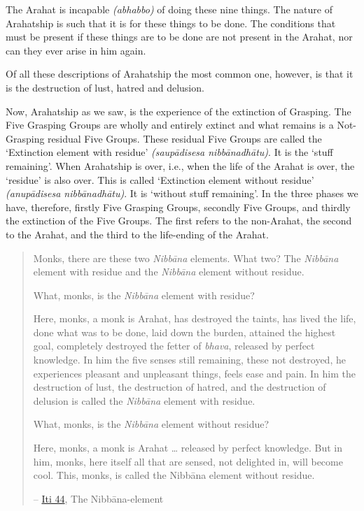 The Arahat is incapable \emph{(abhabbo)} of doing these nine things. The nature of Arahatship is such that it is  for these things to be done. The conditions that must be present if these things are to be done are not present in the Arahat, nor can they ever arise in him again.

Of all these descriptions of Arahatship the most common one, however, is that it is the destruction of lust, hatred and delusion.

\label{ch-13-remainder}Now, Arahatship as we saw, is the experience of the extinction of Grasping. The Five Grasping Groups are wholly and entirely extinct and what remains is a Not-Grasping residual Five Groups. These residual Five Groups are called the `Extinction element with residue' \emph{(saupādisesa nibbānadhātu)}. It is the `stuff remaining'. When Arahatship is over, i.e., when the life of the Arahat is over, the `residue' is also over. This is called `Extinction element without residue' \emph{(anupādisesa nibbānadhātu)}. It is `without stuff remaining'. In the three phases we have, therefore, firstly Five Grasping Groups, secondly Five Groups, and thirdly the extinction of the Five Groups. The first refers to the non-Arahat, the second to the Arahat, and the third to the life-ending of the Arahat.

\begin{quote}
Monks, there are these two \emph{Nibbāna} elements. What two? The \emph{Nibbāna} element with residue and the \emph{Nibbāna} element without residue.

What, monks, is the \emph{Nibbāna} element with residue?

Here, monks, a monk is Arahat, has destroyed the taints, has lived the life, done what was to be done, laid down the burden, attained the highest goal, completely destroyed the fetter of \emph{bhava}, released by perfect knowledge. In him the five senses still remaining, these not destroyed, he experiences pleasant and unpleasant things, feels ease and pain. In him the destruction of lust, the destruction of hatred, and the destruction of delusion is called the \emph{Nibbāna} element with residue.

What, monks, is the \emph{Nibbāna} element without residue?

Here, monks, a monk is Arahat \ldots\hspace{0pt} released by perfect knowledge. But in him, monks, here itself all that are sensed, not delighted in, will become cool. This, monks, is called the Nibbāna element without residue.

 -- \href{https://suttacentral.net/iti44/en/ireland}{Iti 44}, The Nibbāna-element
\end{quote}

